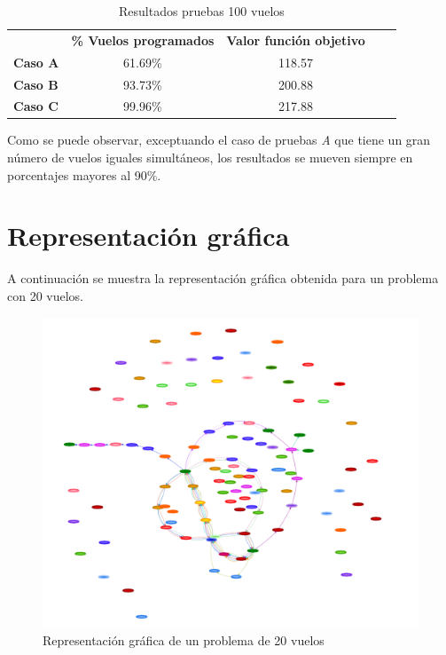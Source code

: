\begin{table}[H]
	\centering
	\caption{Resultados pruebas 100 vuelos}
	\label{resultados 100 vuelos}
	\begin{tabular}{lllll}
		& \textbf{\% Vuelos programados} & \textbf{Valor función objetivo} & \textbf{} & \textbf{} \\
		\textbf{Caso A} & \multicolumn{1}{c}{61.69\%} &\multicolumn{1}{c}{118.57} & &\\
		\textbf{Caso B} & \multicolumn{1}{c}{93.73\%}    &\multicolumn{1}{c}{200.88} & & \\
		\textbf{Caso C} & \multicolumn{1}{c}{99.96\%}    &\multicolumn{1}{c}{217.88} & &
	\end{tabular}
\end{table}

Como se puede observar, exceptuando el caso de pruebas \textit{A} que tiene un gran número de vuelos iguales simultáneos, los resultados se mueven siempre en porcentajes mayores al 90\%.

\section{Representación gráfica}
A continuación se muestra la representación gráfica obtenida para un problema con 20 vuelos.
\begin{figure}[H]
	\begin{center}
		\centering
		\includegraphics[width=1\textwidth]{./imagenes/resultados/resumenRepresentaion.png}
		\caption{Representación gráfica de un problema de 20 vuelos}
		\label{fig: Representación gráfica de un problema de 20 vuelos}
	\end{center}
\end{figure}

